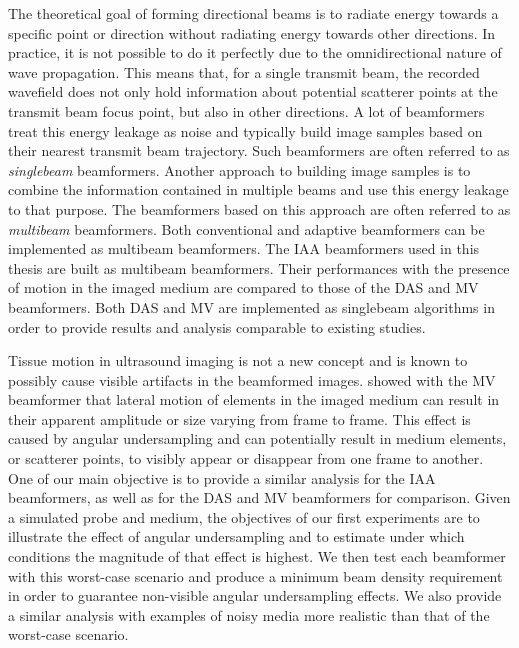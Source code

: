 The theoretical goal of forming directional beams is to radiate energy towards a specific point or direction without radiating energy towards other directions. In practice, it is not possible to do it perfectly due to the omnidirectional nature of wave propagation. This means that, for a single transmit beam, the recorded wavefield does not only hold information about potential scatterer points at the transmit beam focus point, but also in other directions.
A lot of beamformers treat this energy leakage as noise and typically build image samples based on their nearest transmit beam trajectory. Such beamformers are often referred to as \textit{singlebeam} beamformers.
Another approach to building image samples is to combine the information contained in multiple beams and use this energy leakage to that purpose.
The beamformers based on this approach are often referred to as \textit{multibeam} beamformers.
Both conventional and adaptive beamformers can be implemented as multibeam beamformers. The IAA beamformers used in this thesis are built as multibeam beamformers. Their performances with the presence of motion in the imaged medium are compared to those of the DAS and MV beamformers. Both DAS and MV are implemented as singlebeam algorithms in order to provide results and analysis comparable to existing studies.

Tissue motion in ultrasound imaging is not a new concept and is known to possibly cause visible artifacts in the beamformed images. \cite{Asen_shift_invariance} showed with the MV beamformer that lateral motion of elements in the imaged medium can result in their apparent amplitude or size varying from frame to frame. This effect is caused by angular undersampling and can potentially result in medium elements, or scatterer points, to visibly appear or disappear from one frame to another.
One of our main objective is to provide a similar analysis for the IAA beamformers, as well as for the DAS and MV beamformers for comparison.
Given a simulated probe and medium, the objectives of our first experiments are to illustrate the effect of angular undersampling and to estimate under which conditions the magnitude of that effect is highest.
We then test each beamformer with this worst-case scenario and produce a minimum beam density requirement in order to guarantee non-visible angular undersampling effects.
We also provide a similar analysis with examples of noisy media more realistic than that of the worst-case scenario.

